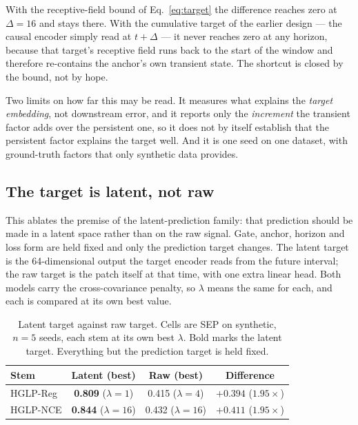 

With the receptive-field bound of Eq.~\ref{eq:target} the difference reaches zero at $\Delta=16$ and stays there. With the cumulative target of the earlier design --- the causal encoder simply read at $t+\Delta$ --- it never reaches zero at any horizon, because that target's receptive field runs back to the start of the window and therefore re-contains the anchor's own transient state. The shortcut is closed by the bound, not by hope.

Two limits on how far this may be read. It measures what explains the \emph{target embedding}, not downstream error, and it reports only the \emph{increment} the transient factor adds over the persistent one, so it does not by itself establish that the persistent factor explains the target well. And it is one seed on one dataset, with ground-truth factors that only synthetic data provides.

\subsection{The target is latent, not raw}

This ablates the premise of the latent-prediction family: that prediction should be made in a latent space rather than on the raw signal. Gate, anchor, horizon and loss form are held fixed and only the prediction target changes. The latent target is the 64-dimensional output the target encoder reads from the future interval; the raw target is the patch itself at that time, with one extra linear head. Both models carry the cross-covariance penalty, so $\lambda$ means the same for each, and each is compared at its own best value.

\begin{table}[!tbp]
\caption{Latent target against raw target. Cells are SEP on synthetic, $n=5$ seeds, each stem at its own best $\lambda$. Bold marks the latent target. Everything but the prediction target is held fixed.}
\label{tab:latentraw}
\centering
\small
\begin{tabular}{lccc}
\hline
Stem & Latent (best) & Raw (best) & Difference \\
\hline
HGLP-Reg & \textbf{0.809} ($\lambda=1$) & 0.415 ($\lambda=4$) & $+0.394$ ($1.95\times$) \\
HGLP-NCE & \textbf{0.844} ($\lambda=16$) & 0.432 ($\lambda=16$) & $+0.411$ ($1.95\times$) \\
\hline
\end{tabular}
\end{table}


